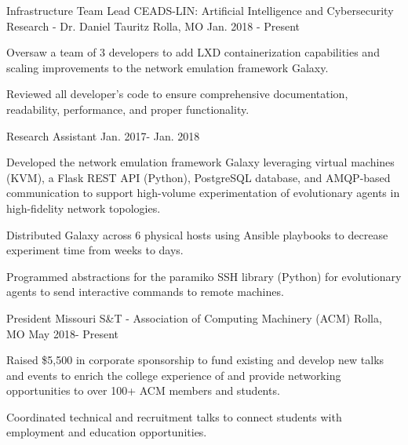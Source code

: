 \begin{cventries}
\cventry
  {Infrastructure Team Lead} %
  {CEADS-LIN: Artificial Intelligence and Cybersecurity Research - Dr. Daniel Tauritz} %
  {Rolla, MO} %
  {Jan. 2018 - Present} %
  {
    \begin{cvitems} %
      \item {Oversaw a team of 3 developers to add LXD containerization
        capabilities and scaling improvements to the network emulation framework
        Galaxy.}
      \item {Reviewed all developer's code to ensure comprehensive
        documentation, readability, performance, and proper functionality.}
    \end{cvitems}
  }

\cventry
  {Research Assistant} %
  {} %
  {} %
  {Jan. 2017- Jan. 2018} %
  {
    \begin{cvitems} %
      \item {Developed the network emulation framework Galaxy leveraging virtual
        machines (KVM), a Flask REST API (Python), PostgreSQL database, and
        AMQP-based communication to support high-volume experimentation of
        evolutionary agents in high-fidelity network topologies.}
      \item {Distributed Galaxy across 6 physical hosts using Ansible playbooks
        to decrease experiment time from weeks to days.}
      \item {Programmed abstractions for the paramiko SSH library (Python) for
        evolutionary agents to send interactive commands to remote machines.}
    \end{cvitems}
  }


\cventry
  {President} %
  {Missouri S\&T - Association of Computing Machinery (ACM)} %
  {Rolla, MO} %
  {May 2018- Present} %
  {
    \begin{cvitems} %
      \item {Raised \$5,500 in corporate sponsorship to fund existing and
        develop new talks and events to enrich the college experience of and
        provide networking opportunities to over 100+ ACM members and students.} 
      \item {Coordinated technical and recruitment talks to connect students
        with employment and education opportunities.}
    \end{cvitems}
  }


\end{cventries}
